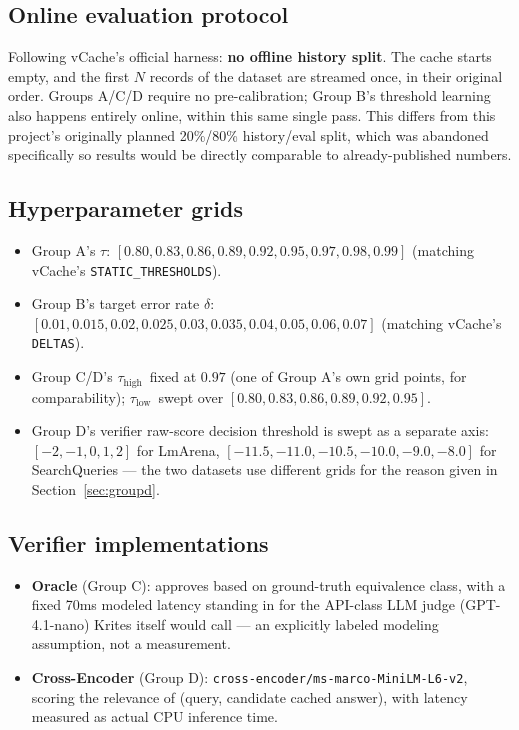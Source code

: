 \documentclass[11pt]{article}
\newcommand{\taulow}{\ensuremath{\tau_{\text{low}}}}
\newcommand{\tauhigh}{\ensuremath{\tau_{\text{high}}}}
\begin{document}
\subsection{Online evaluation protocol}

Following vCache's official harness: \textbf{no offline history split}. The cache starts empty, and the first $N$ records of the dataset are streamed once, in their original order. Groups A/C/D require no pre-calibration; Group B's threshold learning also happens entirely online, within this same single pass. This differs from this project's originally planned 20\%/80\% history/eval split, which was abandoned specifically so results would be directly comparable to already-published numbers.

\subsection{Hyperparameter grids}
\label{sec:grids}

\begin{itemize}[leftmargin=*]
  \item Group A's $\tau$: $[0.80, 0.83, 0.86, 0.89, 0.92, 0.95, 0.97, 0.98, 0.99]$ (matching vCache's \texttt{STATIC\_\allowbreak{}THRESHOLDS}).
  \item Group B's target error rate $\delta$: $[0.01, 0.015, 0.02, 0.025, 0.03, 0.035, 0.04, 0.05, 0.06, 0.07]$ (matching vCache's \texttt{DELTAS}).
  \item Group C/D's \tauhigh\ fixed at $0.97$ (one of Group A's own grid points, for comparability); \taulow\ swept over $[0.80, 0.83, 0.86, 0.89, 0.92, 0.95]$.
  \item Group D's verifier raw-score decision threshold is swept as a separate axis: $[-2, -1, 0, 1, 2]$ for LmArena, $[-11.5, -11.0, -10.5, -10.0, -9.0, -8.0]$ for SearchQueries --- the two datasets use different grids for the reason given in Section~\ref{sec:groupd}.
\end{itemize}

\subsection{Verifier implementations}
\label{sec:verifiers}

\begin{itemize}[leftmargin=*]
  \item \textbf{Oracle} (Group C): approves based on ground-truth equivalence class, with a fixed 70ms modeled latency standing in for the API-class LLM judge (GPT-4.1-nano) Krites itself would call --- an explicitly labeled modeling assumption, not a measurement.
  \item \textbf{Cross-Encoder} (Group D): \texttt{cross-encoder/\allowbreak{}ms-marco-Mini\allowbreak{}LM-L6-v2}, scoring the relevance of (query, candidate cached answer), with latency measured as actual CPU inference time.
\end{itemize}
\end{document}
